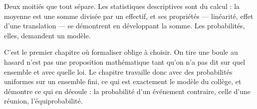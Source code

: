 Deux moitiés que tout sépare. Les statistiques descriptives sont du calcul : la moyenne est
une somme divisée par un effectif, et ses propriétés — linéarité, effet d'une translation —
se démontrent en développant la somme. Les probabilités, elles, demandent un modèle.

C'est le premier chapitre où formaliser oblige à choisir. \og{} On tire une boule au hasard
\fg{} n'est pas une proposition mathématique tant qu'on n'a pas dit sur quel ensemble et avec
quelle loi. Le chapitre travaille donc avec des probabilités uniformes sur un ensemble fini,
ce qui est exactement le modèle du collège, et démontre ce qui en découle : la probabilité
d'un événement contraire, celle d'une réunion, l'équiprobabilité.

